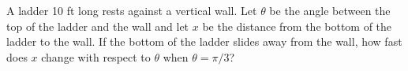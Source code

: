 \documentclass{article}
\begin{document}
A ladder 10 ft long rests against a vertical wall. Let $\theta$ be the angle between the top of the ladder and the wall and let $x$ be the distance from the bottom of the ladder to the wall. If the bottom of the ladder slides away from the wall, how fast does $x$ change with respect to $\theta$ when $\theta = \pi / 3$?
\end{document}
